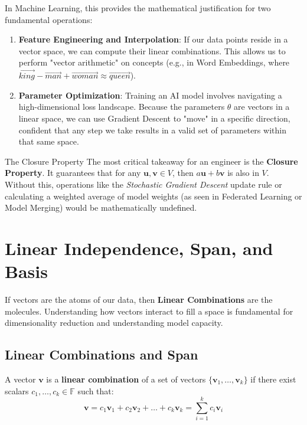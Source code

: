 \documentclass[12pt,a4paper,twoside,openright]{book}
\begin{document}
In Machine Learning, this provides the mathematical justification for two fundamental operations:

\begin{enumerate}
    \item \textbf{Feature Engineering and Interpolation}: If our data points reside in a vector space, we can compute their linear combinations. This allows us to perform "vector arithmetic" on concepts (e.g., in Word Embeddings, where $\vec{king} - \vec{man} + \vec{woman} \approx \vec{queen}$).
    \item \textbf{Parameter Optimization}: Training an AI model involves navigating a high-dimensional loss landscape. Because the parameters $\theta$ are vectors in a linear space, we can use Gradient Descent to "move" in a specific direction, confident that any step we take results in a valid set of parameters within that same space.
\end{enumerate}



\begin{unibobox}{The Closure Property}
    The most critical takeaway for an engineer is the \textbf{Closure Property}. It guarantees that for any $\mathbf{u}, \mathbf{v} \in V$, then $a\mathbf{u} + b\mathbf{v}$ is also in $V$. Without this, operations like the \textit{Stochastic Gradient Descent} update rule or calculating a weighted average of model weights (as seen in Federated Learning or Model Merging) would be mathematically undefined.
\end{unibobox}


\section{Linear Independence, Span, and Basis}

If vectors are the atoms of our data, then \textbf{Linear Combinations} are the molecules. Understanding how vectors interact to fill a space is fundamental for dimensionality reduction and understanding model capacity.

\subsection{Linear Combinations and Span}
A vector $\mathbf{v}$ is a \textbf{linear combination} of a set of vectors $\{\mathbf{v}_1, \dots, \mathbf{v}_k\}$ if there exist scalars $c_1, \dots, c_k \in \mathbb{F}$ such that:
\begin{equation}
    \mathbf{v} = c_1\mathbf{v}_1 + c_2\mathbf{v}_2 + \dots + c_k\mathbf{v}_k = \sum_{i=1}^k c_i\mathbf{v}_i
\end{equation}
\end{document}
